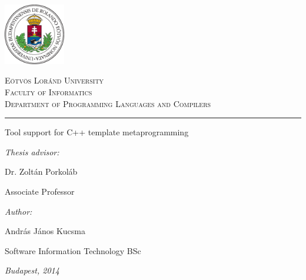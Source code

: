 \begin{titlepage}

\noindent
\parbox[m]{0.2\textwidth}{
    \includegraphics[width=0.2\textwidth]{img/elte_logo_colored.eps}
}
\hfill
\parbox[m]{0.7\textwidth}{
    \begin{center}
    \begin{large}
    \textsc{
        Eötvös Loránd University\\
        \vspace{0.5pc}
        Faculty of Informatics\\
        \vspace{0.5pc}
        Department of Programming Languages and Compilers\\
    }
    \end{large}
    \end{center}
}

\vspace{1pc}
\hrule

\vfill

\begin{center}
    {\LARGE Tool support for C++ template metaprogramming}
\end{center}

\vfill

\noindent
\hspace*{0.05\textwidth}
\parbox{0.45\textwidth}{
    {\it Thesis advisor:}
    \bigskip

    {\Large Dr. Zoltán Porkoláb}
    \smallskip

    Associate Professor
}
\hfill
\parbox{0.45\textwidth}{
    {\it Author:}
    \bigskip

    {\Large András János Kucsma}
    \smallskip

    Software Information Technology BSc
}


\vfill

\begin{center}
    {\large {\it Budapest, 2014}}
\end{center}

\end{titlepage}
